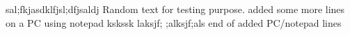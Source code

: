 sal;fkjasdklfjsl;dfjsaldj
Random text for testing purpose.
added some more lines on a PC using notepad
kskssk laksjf;
;alksjf;als
end of added PC/notepad lines
